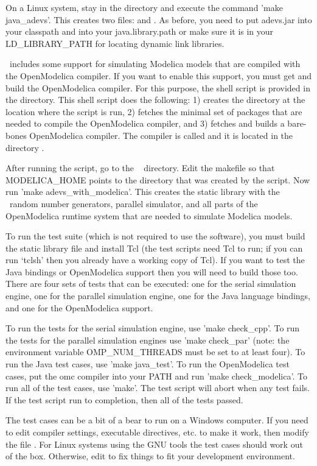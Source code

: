 On a Linux system, stay in the  directory and execute the command 'make java\_adevs'. This creates two files:  and . As before, you need to put adevs.jar into your classpath and  into your java.library.path or make sure it is in your LD\_LIBRARY\_PATH for locating dynamic link libraries.

\adevs\ includes some support for simulating Modelica models that are compiled with the OpenModelica compiler. If you want to enable this support, you must get and build the OpenModelica compiler. For this purpose, the shell script  is provided in the  directory. This shell script does the following: 1) creates the directory  at the location where the script is run, 2) fetches the minimal set of packages that are needed to compile the OpenModelica compiler, and 3) fetches and builds a bare-bones OpenModelica compiler. The compiler is called  and it is located in the directory .

After running the  script, go to the \adevs\  directory. Edit the makefile so that MODELICA\_HOME points to the  directory that was created by the  script. Now run 'make adevs\_with\_modelica'. This creates the static library  with the \adevs\ random number generators, parallel simulator, and all parts of the OpenModelica runtime system that are needed to simulate Modelica models.

To run the test suite (which is not required to use the software), you must build the static library file and install Tcl (the test scripts need Tcl to run; if you can run `tclsh' then you already have a working copy of Tcl). If you want to test the Java bindings or OpenModelica support then you will need to build those too. There are four sets of tests that can be executed: one for the serial simulation engine, one for the parallel simulation engine, one for the Java language bindings, and one for the OpenModelica support.

To run the tests for the serial simulation engine, use 'make check\_cpp'. To run the tests for the parallel simulation engines use 'make check\_par' (note: the environment variable OMP\_NUM\_THREADS must be set to at least four). To run the Java test cases, use 'make java\_test'. To run the OpenModelica test cases, put the omc compiler into your PATH and run 'make check\_modelica'. To run all of the test cases, use 'make'. The test script will abort when any test fails. If the test script run to completion, then all of the tests passed.

The test cases can be a bit of a bear to run on a Windows computer. If you need to edit compiler settings, executable directives, etc. to make it work, then modify the file . For Linux systems using the GNU tools the test cases should work out of the box. Otherwise, edit  to fix things to fit your development environment.
